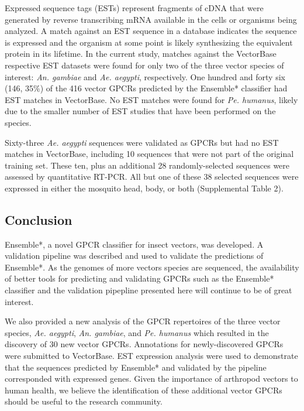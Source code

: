 Expressed sequence tags (ESTs) represent fragments of cDNA that were generated by reverse transcribing mRNA available in the cells or organisms being analyzed. A match against an EST sequence in a database indicates the sequence is expressed and the organism at some point is likely synthesizing the equivalent protein in its lifetime. In the current study, matches against the VectorBase respective EST datasets were found for only two of the three vector species of interest: \emph{An. gambiae} and \emph{Ae. aegypti}, respectively. One hundred and forty six (146, 35\%) of the 416 vector GPCRs predicted by the Ensemble* classifier had EST matches in VectorBase. No EST matches were found for \emph{Pe. humanus}, likely due to the smaller number of EST studies that have been performed on the species. 

Sixty-three \emph{Ae. aegypti} sequences were validated as GPCRs but had no EST matches in VectorBase, including 10 sequences that were not part of the original training set. These ten, plus an additional 28 randomly-selected sequences were assessed by quantitative RT-PCR.  All but one of these 38 selected sequences were expressed in either the mosquito head, body, or both (Supplemental Table 2).   

\subsection{Conclusion}

Ensemble*, a novel GPCR classifier for insect vectors, was developed.  A validation pipeline was described and used to validate the predictions of Ensemble*.  As the genomes of more vectors species are sequenced, the availability of better tools for predicting and validating GPCRs such as the Ensemble* classifier and the validation pipepline presented here will continue to be of great interest.

We also provided a new analysis of the GPCR repertoires of the three vector species, \emph{Ae. aegypti}, \emph{An. gambiae}, and \emph{Pe. humanus} which resulted in the discovery of 30 new vector GPCRs.  Annotations for newly-discovered GPCRs were submitted to VectorBase.  EST expression analysis were used to demonstrate that the sequences predicted by Ensemble* and validated by the pipeline corresponded with expressed genes.  Given the importance of arthropod vectors to human health, we believe the identification of these additional vector GPCRs should be useful to the research community.  



